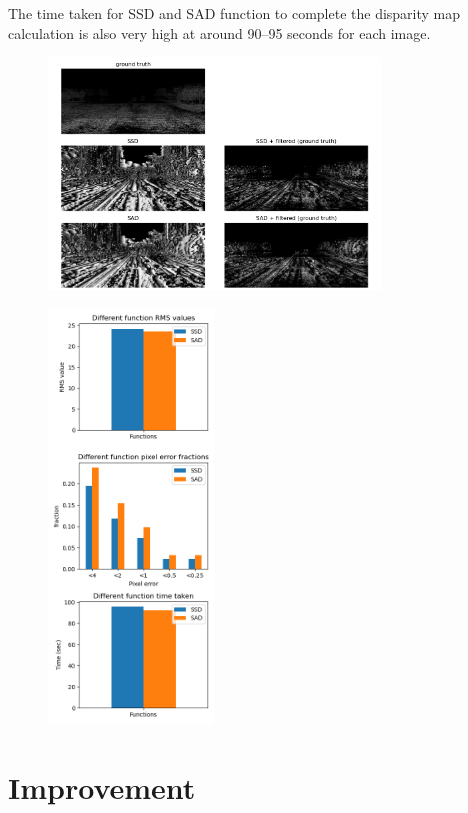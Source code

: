 \documentclass[conference]{IEEEtran}
\begin{document}
The time taken for SSD and SAD function to complete the disparity map calculation is also very high at around 90--95 seconds for each image.
\begin{figure}[H]
    \centering
    \includegraphics[width=8.8cm]{702_output_1_25.png}
\end{figure}
\begin{figure}[H]
    \centering
    \includegraphics[height=11cm]{702_stats_1_25.png}
\end{figure}
\section{Improvement}
\end{document}
